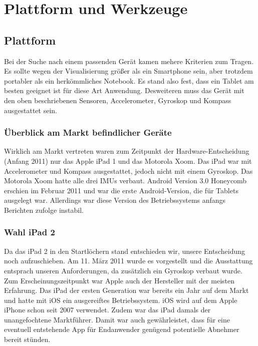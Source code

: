 
\chapter{Plattform und Werkzeuge}
  \label{Plattform und Werkzeuge}
  
  \section{Plattform}
  
  \medskip
Bei der Suche nach einem passenden Gerät kamen mehere Kriterien zum Tragen. Es sollte wegen der Visualisierung größer als ein Smartphone sein, aber trotzdem portabler als ein herkömmliches Notebook. Es stand also fest, dass ein Tablet am besten geeignet ist für diese Art Anwendung. Desweiteren muss das Gerät mit den oben beschriebenen Sensoren, Accelerometer, Gyroskop und Kompass ausgestattet sein.

	\subsection{Überblick am Markt befindlicher Geräte}
Wirklich am Markt vertreten waren zum Zeitpunkt der Hardware-Entscheidung (Anfang 2011) nur das Apple iPad 1 und das Motorola Xoom. Das iPad war mit Accelerometer und Kompass ausgestattet, jedoch nicht mit einem Gyroskop. Das Motorola Xoom hatte alle drei IMUs verbaut. Android Version 3.0 Honeycomb erschien im Februar 2011 und war die erste Android-Version, die für Tablets ausgelegt war. \cite{ wiki:005} Allerdings war diese Version des Betriebssystems anfangs Berichten zufolge instabil.
	
	\subsection{Wahl iPad 2}
	Da das iPad 2 in den Startlöchern stand entschieden wir, unsere Entscheidung noch aufzuschieben. Am 11. März 2011 wurde es vorgestellt und die Ausstattung entsprach unseren Anforderungen, da zusätzlich ein Gyroskop verbaut wurde. Zum Erscheinungszeitpunkt war Apple auch der Hersteller mit der meisten Erfahrung. Das iPad der ersten Generation war bereits ein Jahr auf dem Markt und hatte mit iOS ein ausgereiftes Betriebssystem. iOS wird auf dem Apple iPhone schon seit 2007 verwendet. Zudem war das iPad damals der unangefochtene Marktführer. Damit war auch gewährleistet, dass für eine eventuell entstehende App für Endanwender genügend potentielle Abnehmer bereit stünden.
	

